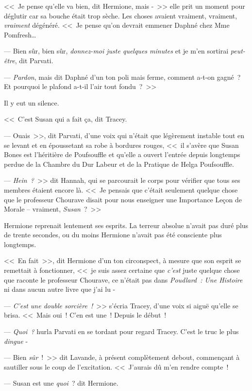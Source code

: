 <<~Je pense qu'elle va bien, dit Hermione, mais -~>> elle prit un moment pour déglutir car sa bouche était trop sèche. Les choses avaient vraiment, vraiment, \emph{vraiment} dégénéré. <<~Je pense qu'on devrait emmener Daphné chez Mme Pomfresh…

--- Bien sûr, bien sûr, \emph{donnez-moi juste quelques minutes} et je m'en sortirai \emph{peut-être}, dit Parvati.

--- \emph{Pardon}, mais dit Daphné d'un ton poli mais ferme, comment a-t-on gagné~? Et pourquoi le plafond a-t-il l'air tout fondu~?~>>

Il y eut un silence.

<<~C'est Susan qui a fait ça, dit Tracey.

--- Ouais~>>, dit Parvati, d'une voix qui n'était que légèrement instable tout en se levant et en époussetant sa robe à bordures rouges, <<~il s'avère que Susan Bones est l'héritière de Poufsouffle et qu'elle a ouvert l'entrée depuis longtemps perdue de la Chambre du Dur Labeur et de la Pratique de Helga Poufsouffle.

--- \emph{Hein~?}~>> dit Hannah, qui se parcourait le corps pour vérifier que tous ses membres étaient encore là. <<~Je pensais que c'était seulement quelque chose que le professeur Chourave disait pour nous enseigner une Importance Leçon de Morale -- vraiment, \emph{Susan}~?~>>

Hermione reprenait lentement ses esprits. La terreur absolue n'avait pas duré plus de trente secondes, ou du moins Hermione n'avait pas été consciente plus longtemps.

<<~En fait~>>, dit Hermione d'un ton circonspect, à mesure que son esprit se remettait à fonctionner, <<~je suis assez certaine que \emph{c'est} juste quelque chose que raconte le professeur Chourave, ce n'était pas dans \emph{Poudlard~: Une Histoire} ni dans aucun autre livre que j'ai lu -

--- \emph{C'est une double sorcière~!}~>> s'écria Tracey, d'une voix si aiguë qu'elle se brisa. <<~Mais oui~! C'en est une~! Depuis le début~!

--- \emph{Quoi~?} hurla Parvati en se tordant pour regard Tracey. C'est le truc le plus \emph{dingue} -

--- Bien \emph{sûr}~!~>> dit Lavande, à présent complètement debout, commençant à sautiller sous le coup de l'excitation. <<~J'aurais dû m'en rendre compte~!

--- Susan est une \emph{quoi}~? dit Hermione.

